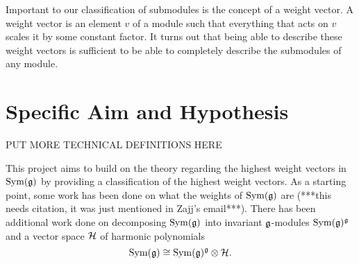 \documentclass[11pt, reqno]{amsart}
\begin{document}
Important to our classification of submodules is the concept of a weight vector.
A weight vector is an element $v$ of a module such that everything that acts on
$v$ scales it by some constant factor. It turns out that being able to describe
these weight vectors is sufficient to be able to completely describe the
submodules of any module.






\section{Specific Aim and Hypothesis}

PUT MORE TECHNICAL DEFINITIONS HERE


This project aims to build on the theory regarding the highest weight vectors in $\operatorname{Sym}(\mathfrak{g})$ by providing a classification of the highest weight vectors.  As a starting point, some work has been done on what the weights of $\operatorname{Sym}(\mathfrak{g})$ are (***this needs citation, it was just mentioned in Zajj's email***). There has been additional work done on decomposing $\operatorname{Sym}(\mathfrak{g})$ into invariant $\mathfrak{g}$-modules $\operatorname{Sym}(\mathfrak{g})^{\mathfrak{g}}$ and a vector space $\mathcal{H}$ of harmonic polynomials \cite[(3.10)]{NeRa2004}
\[\operatorname{Sym}(\mathfrak{g})\cong\operatorname{Sym}(\mathfrak{g})^{\mathfrak{g}}\otimes\mathcal{H}.\] 
\end{document}
